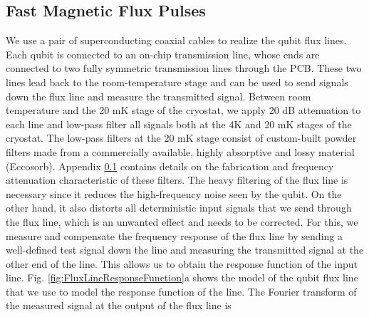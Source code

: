 \subsection{Fast Magnetic Flux Pulses}

We use a pair of superconducting coaxial cables to realize the qubit flux lines. Each qubit is connected to an on-chip transmission line, whose ends are connected to two fully symmetric transmission lines through the PCB. These two lines lead back to the room-temperature stage and can be used to send signals down the flux line and measure the transmitted signal. Between room temperature and the 20 mK stage of the cryostat, we apply 20 dB attenuation to each line and low-pass filter all signals both at the 4K and 20 mK stages of the cryostat. The low-pass filters at the 20 mK stage consist of custom-built powder filters made from a commercially available, highly absorptive and lossy material (Eccosorb). Appendix \ref{} contains details on the fabrication and frequency attenuation characteristic of these filters. The heavy filtering of the flux line is necessary since it reduces the high-frequency noise seen by the qubit. On the other hand, it also distorts all deterministic input signals that we send through the flux line, which is an unwanted effect and needs to be corrected. For this, we measure and compensate the frequency response of the flux line by sending a well-defined test signal down the line and measuring the transmitted signal at the other end of the line. This allows us to obtain the response function of the input line. Fig. \ref{fig:FluxLineResponseFunction}a shows the model of the qubit flux line that we use to model the response function of the line. The Fourier transform of the measured signal at the output of the flux line is

